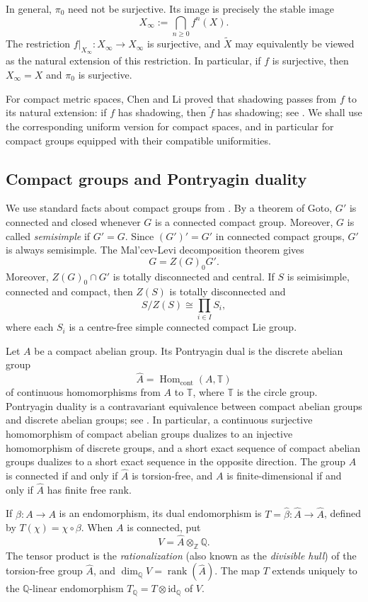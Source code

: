 \documentclass[12pt]{amsart}
\theoremstyle{definition}
\numberwithin{equation}{section}
\theoremstyle{remark}
\def\id{{\text{id}}}
\def\Hom{\operatorname{Hom}}
\begin{document}
In general, $\pi_0$ need not be surjective. Its image is precisely the
stable image
\[
X_\infty:=\bigcap_{n\geq0}f^n(X).
\]
The restriction $f|_{X_\infty}:X_\infty\to X_\infty$ is surjective,
and $\widetilde X$ may equivalently be viewed as the natural extension
of this restriction. In particular, if $f$ is surjective, then
$X_\infty=X$ and $\pi_0$ is surjective.

For compact metric spaces, Chen and Li proved that shadowing passes
from $f$ to its natural extension: if $f$ has shadowing, then
$\widetilde f$ has shadowing; see \cite[Theorem~1.3]{CL}. We shall use
the corresponding uniform version for compact spaces, and in
particular for compact groups equipped with their compatible
uniformities.

\subsection{Compact groups and Pontryagin duality}

We use standard facts about compact groups from \cite[Chapter 9]{HM}. By a theorem of Goto, $G'$ is connected and closed whenever $G$ is a connected compact group. Moreover, $G$ is called
\emph{semisimple} if $G'=G$. Since $(G')'=G'$ in connected compact groups, $G'$ is always semisimple. The Mal'cev-Levi decomposition theorem gives 
\[
G=Z(G)_0G'.
\]
Moreover, $Z(G)_0\cap G'$ is totally disconnected and central. If $S$ is seimisimple, connected and compact, then $Z(S)$ is totally disconnected and
\[
S/Z(S)\cong\prod_{i\in I}S_i,
\]
where each $S_i$ is a centre-free simple connected compact Lie group.

Let $A$ be a compact abelian group. Its Pontryagin dual is the discrete abelian
group
\[
\widehat A
=
\Hom_{\mathrm{cont}}(A,\mathbb T)
\]
of continuous homomorphisms from $A$ to $\mathbb T$, where $\mathbb T$ is the circle group. Pontryagin duality is a contravariant
equivalence between compact abelian groups and discrete abelian groups; see
\cite{Morris}. In particular, a continuous surjective homomorphism of compact
abelian groups dualizes to an injective homomorphism of discrete groups, and a
short exact sequence of compact abelian groups dualizes to a short exact
sequence in the opposite direction. The group $A$ is connected if and only if
$\widehat A$ is torsion-free, and $A$ is finite-dimensional if and only if
$\widehat A$ has finite free rank.

If $\beta:A\to A$ is an endomorphism, its dual endomorphism is
$T=\widehat\beta:\widehat A\to\widehat A$, defined by
$T(\chi)=\chi\circ\beta$. When $A$ is connected, put
\[
V=\widehat A\otimes_{\mathbb Z}\mathbb Q.
\]
The tensor product is the \emph{rationalization} (also known as the \emph{divisible hull}) of the torsion-free group
$\widehat A$, and
$\dim_{\mathbb Q}V=\operatorname{rank}(\widehat A)$. The map $T$ extends
uniquely to the $\mathbb Q$-linear endomorphism
$T_{\mathbb Q}=T\otimes\id_{\mathbb Q}$ of $V$.
\end{document}
